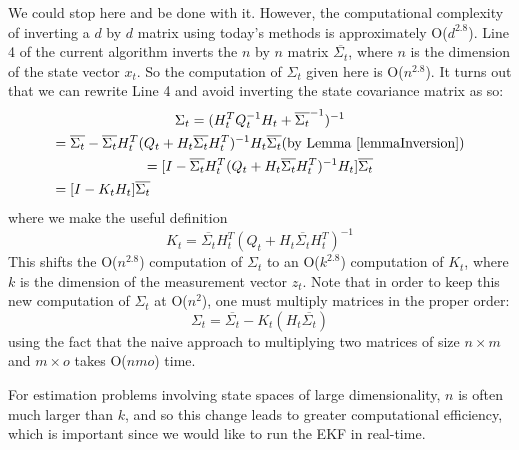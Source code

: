 We could stop here and be done with it. However, the computational complexity of inverting a \(d\) by \(d\) matrix using today's methods is approximately O(\(d^{2.8}\)). Line 4 of the current algorithm inverts the \(n\) by \(n\) matrix \(\overline{\Sigma_t}\), where \(n\) is the dimension of the state vector \(x_t\). So the computation of \(\Sigma_t\) given here is O(\(n^{2.8}\)). It turns out that we can rewrite Line 4 and avoid inverting the state covariance matrix as so:
\begin{multline*}
\Sigma_t = (H_t^T Q_t^{-1} H_t + \overline{\Sigma_t}^{-1})^{-1} \\
= \overline{\Sigma_t} - \overline{\Sigma_t} H_t^T (Q_t + H_t \overline{\Sigma_t} H_t^T)^{-1} H_t \overline{\Sigma_t} \hfill \text{(by Lemma \ref{lemmaInversion})} \\
= [ I - \overline{\Sigma_t} H_t^T (Q_t + H_t \overline{\Sigma_t} H_t^T)^{-1} H_t ] \overline{\Sigma_t} \\
= [I - K_t H_t] \overline{\Sigma_t} \hfill
\end{multline*}
where we make the useful definition 
\[
K_t = \overline{\Sigma_t} H_t^T (Q_t + H_t \overline{\Sigma_t} H_t^T)^{-1}
\]
This shifts the O(\(n^{2.8}\)) computation of \(\Sigma_t\) to an O(\(k^{2.8}\)) computation of \(K_t\), where \(k\) is the dimension of the measurement vector \(z_t\). Note that in order to keep this new computation of \(\Sigma_t\) at O(\(n^2\)), one must multiply matrices in the proper order:
\[\Sigma_t = \overline{\Sigma_t} - K_t (H_t \overline{\Sigma_t})
\]
using the fact that the naive approach to multiplying two matrices of size \(n \times m\) and \(m \times o\) takes O(\(n m o\)) time.

For estimation problems involving state spaces of large dimensionality, \(n\) is often much larger than \(k\), and so this change leads to greater computational efficiency, which is important since we would like to run the EKF in real-time.

